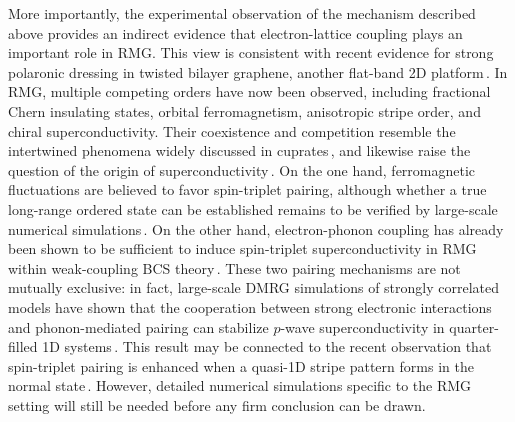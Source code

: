 \documentclass[aps,prx,article,twocolumn,amsmath,amssymb,superscriptaddress,longbibliography]{revtex4-2}
\begin{document}
More importantly, the experimental observation of the mechanism described above provides an indirect evidence that electron-lattice coupling plays an important role in RMG. This view is consistent with recent evidence for strong polaronic dressing in twisted bilayer graphene, another flat-band 2D platform\,\cite{chen2024strong}. In RMG, multiple competing orders have now been observed, including fractional Chern insulating states, orbital ferromagnetism, anisotropic stripe order, and chiral superconductivity. Their coexistence and competition resemble the intertwined phenomena widely discussed in cuprates\,\cite{fradkin2015colloquium, davis2013concepts, ghiringhelli2012long, arpaia2019dynamical, comin2015symmetry, lee2020spectroscopic}, and likewise raise the question of the origin of superconductivity\,\cite{jiang2019superconductivity, chung2020plaquette}. On the one hand, ferromagnetic fluctuations are believed to favor spin-triplet pairing, although whether a true long-range ordered state can be established remains to be verified by large-scale numerical simulations\,\cite{xu2024coexistence, jiang2021ground}. On the other hand, electron-phonon coupling has already been shown to be sufficient to induce spin-triplet superconductivity in RMG within weak-coupling BCS theory\,\cite{zan2024electron}. These two pairing mechanisms are not mutually exclusive: in fact, large-scale DMRG simulations of strongly correlated models have shown that the cooperation between strong electronic interactions and phonon-mediated pairing can stabilize $p$-wave superconductivity in quarter-filled 1D systems\,\cite{qu2022spin}. This result may be connected to the recent observation that spin-triplet pairing is enhanced when a quasi-1D stripe pattern forms in the normal state\,\cite{qin2025extreme}. However, detailed numerical simulations specific to the RMG setting will still be needed before any firm conclusion can be drawn.
\end{document}
